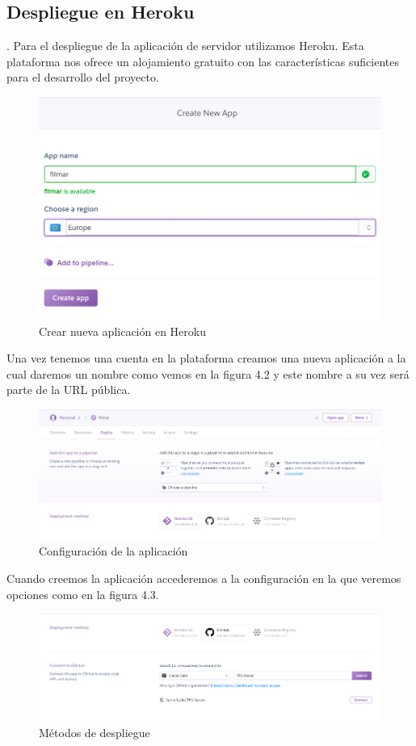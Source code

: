 \subsection{Despliegue en Heroku}. 
\label{makereference4.2.1}
Para el despliegue de la aplicación de servidor utilizamos Heroku. Esta plataforma nos ofrece un alojamiento gratuito con las características suficientes para el desarrollo del proyecto.
\begin{figure}[H]
    \centering
    \includegraphics[width=6in]{figures/chapter-4/heroku_1.png}
    \caption{Crear nueva aplicación en Heroku}
\end{figure}
Una vez tenemos una cuenta en la plataforma creamos una nueva aplicación a la cual daremos un nombre como vemos en la figura 4.2 y este nombre a su vez será parte de la URL pública.
\begin{figure}[H]
    \centering
    \includegraphics[width=6in]{figures/chapter-4/heroku_2.png}
    \caption{Configuración de la aplicación}
\end{figure}
Cuando creemos la aplicación accederemos a la configuración en la que veremos opciones como en la figura 4.3.
\begin{figure}[H]
    \centering
    \includegraphics[width=6in]{figures/chapter-4/heroku_3.png}
    \caption{Métodos de despliegue}
\end{figure}
